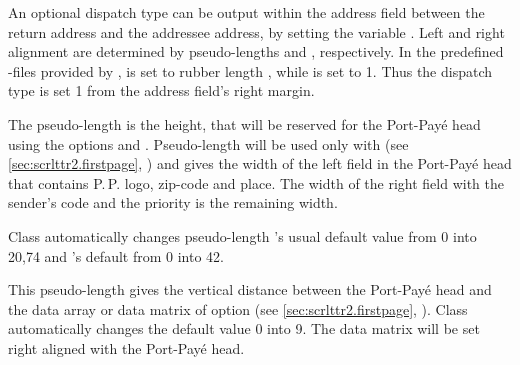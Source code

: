 \begin{Declaration}
\end{Declaration}
An optional dispatch type can be output within the address field between the
return address and the addressee address, by setting the variable
. Left and right alignment are determined by
pseudo-lengths  and
, respectively. In the predefined
-files
provided by \KOMAScript,  is set to rubber length
, while  is set to
1. Thus the dispatch type is set 1 from the address field's
right margin.
%
\EndIndexGroup


\begin{Declaration}
\end{Declaration}
The pseudo-length  is
the height, that will be reserved for the Port-Pay\'e head using the options
 and
%
. Pseudo-length
 will be used only with  (see
\autoref{sec:scrlttr2.firstpage},
) and gives the width of the left
field in the Port-Pay\'e head that contains P.\,P. logo, zip-code and
place. The width of the right field with the sender's code and the priority is
the remaining width.

Class  automatically changes
pseudo-length 's usual default value
from 0 into 20,74 and 's default from
0 into 42.%
%
\EndIndexGroup


\begin{Declaration}
\end{Declaration}
This pseudo-length gives the vertical
distance between the Port-Pay\'e head and the data array or data matrix of
option %
(see \autoref{sec:scrlttr2.firstpage},
). Class
 automatically changes the default value 0 into
9. The data matrix will be set right aligned with the Port-Pay\'e
head.%
%
\EndIndexGroup
%
\EndIndexGroup


